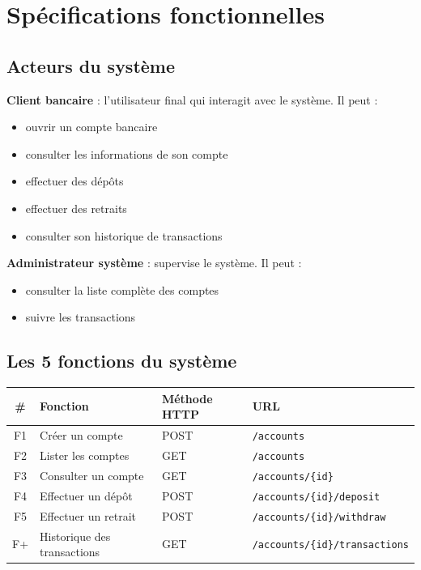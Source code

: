\documentclass[12pt,a4paper]{article}
\begin{document}
\section{Spécifications fonctionnelles}

\subsection{Acteurs du système}

\textbf{Client bancaire} : l'utilisateur final qui interagit avec le système. Il peut :
\begin{itemize}[noitemsep]
  \item ouvrir un compte bancaire
  \item consulter les informations de son compte
  \item effectuer des dépôts
  \item effectuer des retraits
  \item consulter son historique de transactions
\end{itemize}

\textbf{Administrateur système} : supervise le système. Il peut :
\begin{itemize}[noitemsep]
  \item consulter la liste complète des comptes
  \item suivre les transactions
\end{itemize}

\subsection{Les 5 fonctions du système}

\begin{center}
\begin{tabular}{clll}
\toprule
\textbf{\#} & \textbf{Fonction} & \textbf{Méthode HTTP} & \textbf{URL} \\
\midrule
F1 & Créer un compte & POST & \texttt{/accounts} \\
F2 & Lister les comptes & GET & \texttt{/accounts} \\
F3 & Consulter un compte & GET & \texttt{/accounts/\{id\}} \\
F4 & Effectuer un dépôt & POST & \texttt{/accounts/\{id\}/deposit} \\
F5 & Effectuer un retrait & POST & \texttt{/accounts/\{id\}/withdraw} \\
F+ & Historique des transactions & GET & \texttt{/accounts/\{id\}/transactions} \\
\bottomrule
\end{tabular}
\end{center}
\end{document}
